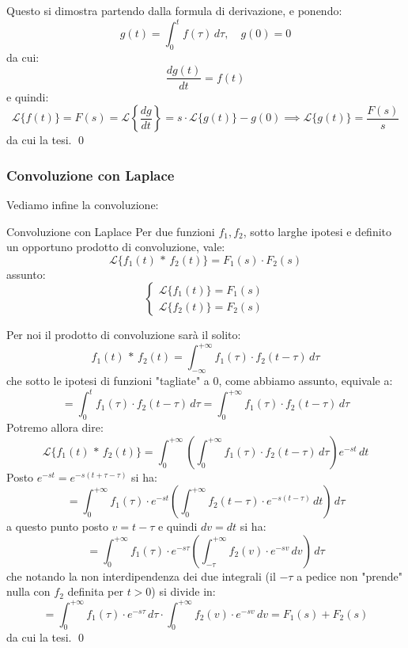\documentclass[a4paper,11pt]{article}
\begin{document}
Questo si dimostra partendo dalla formula di derivazione, e ponendo:
$$
g(t) = \int_0^t f(\tau) \, d\tau, \quad g(0) = 0
$$
da cui:
$$
\frac{d g(t)}{dt} = f(t)
$$
e quindi:
$$
\mathcal{L}\{f(t)\} = F(s) = \mathcal{L} \left\{ \frac{dg}{dt} \right\} = s \cdot \mathcal{L}\{g(t)\} - g(0) \implies \mathcal{L}\{g(t)\} = \frac{F(s)}{s}
$$
da cui la tesi. \qed

\subsubsection{Convoluzione con Laplace}
Vediamo infine la convoluzione:
\begin{theorem}{Convoluzione con Laplace}
	Per due funzioni $f_1, f_2$, sotto larghe ipotesi e definito un opportuno prodotto di convoluzione, vale:
	$$
		\mathcal{L}\{ f_1(t) \, * \, f_2(t) \} = F_1(s) \cdot F_2(s)
	$$
	assunto:
	\[
		\begin{cases}
			\mathcal{L} \{ f_1(t) \} = F_1(s) \\ 	
			\mathcal{L} \{ f_2(t) \} = F_2(s) 	
		\end{cases}
	\]
\end{theorem}

Per noi il prodotto di convoluzione sarà il solito:
$$
f_1(t) \, * \, f_2(t) = \int_{-\infty}^{+ \infty} f_1(\tau) \cdot f_2(t - \tau) \, d\tau
$$
che sotto le ipotesi di funzioni "tagliate" a 0, come abbiamo assunto, equivale a:
$$
= \int_0^t f_1(\tau) \cdot f_2(t - \tau) \, d\tau = \int_0^{+\infty} f_1(\tau) \cdot f_2(t - \tau) \, d\tau
$$
Potremo allora dire:
$$
\mathcal{L} \{ f_1(t) \, * \, f_2(t) \} = \int_0^{+\infty} \left( \int_0^{+ \infty} f_1(\tau) \cdot f_2(t - \tau) \, d\tau \right) e^{-st} \, dt
$$
Posto $e^{-st} = e^{-s(t + \tau - \tau)}$ si ha:
$$
= \int_0^{+\infty} f_1(\tau) \cdot e^{-st} \left( \int_0^{+\infty} f_2(t - \tau) \cdot e^{-s(t - \tau)} \, dt \right) \, d\tau
$$
a questo punto posto $v = t - \tau$ e quindi $dv = dt$ si ha:
$$
= \int_0^{+\infty} f_1(\tau) \cdot e^{- s \tau} \left( \int_{-\tau}^{+\infty} f_2(v) \cdot e^{-sv} \, dv \right) \, d\tau
$$
che notando la non interdipendenza dei due integrali (il $-\tau$ a pedice non "prende" nulla con $f_2$ definita per $t > 0$) si divide in:
$$
= \int_0^{+\infty} f_1(\tau) \cdot e^{- s \tau} \, d\tau \cdot \int_0^{+\infty} f_2(v) \cdot e^{-sv} \, dv = F_1(s) + F_2(s)
$$
da cui la tesi. \qed
\end{document}
